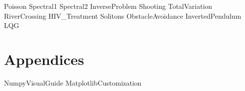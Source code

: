 \documentclass[opener-c,labs,green,nociteref]{HJnewsiambook}
\begin{document}
{Poisson}
{Spectral1}
{Spectral2}
{InverseProblem}
{Shooting}
{TotalVariation}
{RiverCrossing}
{HIV_Treatment}
{Solitons}
{ObstacleAvoidance}
{InvertedPendulum}
{LQG}

\fi

\part{Appendices}
\begin{appendices}
{NumpyVisualGuide}
{MatplotlibCustomization}
\end{appendices}



\end{document}
